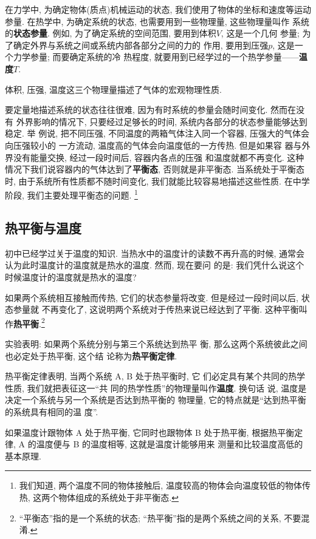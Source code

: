 \documentclass[11pt,a4paper]{ctexbook}
\begin{document}
在力学中, 为确定物体(质点)机械运动的状态, 我们使用了物体的坐标和速度等运动参量.
在热学中, 为确定系统的状态, 也需要用到一些物理量, 这些物理量叫作
系统的\textbf{状态参量}. 例如, 为了确定系统的空间范围, 要用到体积$V$, 这是一个几何
参量; 为了确定外界与系统之间或系统内部各部分之间的力的
作用, 要用到压强$p$, 这是一个力学参量; 而要确定系统的冷
热程度, 就要用到已经学过的一个热学参量——\textbf{温度}$T$.

体积, 压强, 温度这三个物理量描述了气体的宏观物理性质.

要定量地描述系统的状态往往很难, 因为有时系统的参量会随时间变化. 然而在没有
外界影响的情况下, 只要经过足够长的时间, 系统内各部分的状态参量能够达到稳定. 举
例说, 把不同压强, 不同温度的两箱气体注入同一个容器, 压强大的气体会向压强较小的
一方流动, 温度高的气体会向温度低的一方传热. 但是如果容
器与外界没有能量交换, 经过一段时间后, 容器内各点的压强
和温度就都不再变化. 这种情况下我们说容器内的气体达到了\textbf{平衡态},
否则就是非平衡态. 当系统处于平衡态时, 由于系统所有性质都不随时间变化,
我们就能比较容易地描述这些性质. 在中学阶段, 我们主要处理平衡态的问题. \footnote{我们知道, 两个温度不同的物体接触后, 温度较高的物体会向温度较低的物体传热, 这两个物体组成的系统处于非平衡态.}

\subsection{热平衡与温度}

初中已经学过关于温度的知识. 当热水中的温度计的读数不再升高的时候,
通常会认为此时温度计的温度就是热水的温度. 然而, 现在要问
的是: 我们凭什么说这个时候温度计的温度就是热水的温度?

如果两个系统相互接触而传热, 它们的状态参量将改变. 但是经过一段时间以后, 状态参量就
不再变化了, 这说明两个系统对于传热来说已经达到了平衡. 这种平衡叫作\textbf{热平衡}.\footnote{``平衡态''指的是一个系统的状态; ``热平衡''指的是两个系统之间的关系, 不要混淆.}

实验表明: 如果两个系统分别与第三个系统达到热平
衡, 那么这两个系统彼此之间也必定处于热平衡, 这个结
论称为\textbf{热平衡定律}.

热平衡定律表明, 当两个系统 A, B 处于热平衡时, 它
们必定具有某个共同的热学性质, 我们就把表征这一``共
同的热学性质''的物理量叫作\textbf{温度}. 换句话
说, 温度是决定一个系统与另一个系统是否达到热平衡的
物理量, 它的特点就是``达到热平衡的系统具有相同的温
度''.

如果温度计跟物体 A 处于热平衡, 它同时也跟物体 B 处于热平衡,
根据热平衡定律, A 的温度便与 B 的温度相等, 这就是温度计能够用来
测量和比较温度高低的基本原理.
\end{document}
